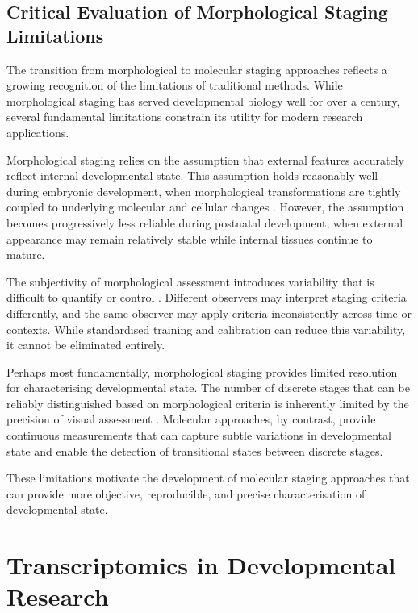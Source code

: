 \subsection{Critical Evaluation of Morphological Staging Limitations}

The transition from morphological to molecular staging approaches reflects a growing recognition of the limitations of traditional methods. While morphological staging has served developmental biology well for over a century, several fundamental limitations constrain its utility for modern research applications.

Morphological staging relies on the assumption that external features accurately reflect internal developmental state. This assumption holds reasonably well during embryonic development, when morphological transformations are tightly coupled to underlying molecular and cellular changes \parencite{orahilly_developmental_2010}. However, the assumption becomes progressively less reliable during postnatal development, when external appearance may remain relatively stable while internal tissues continue to mature.

The subjectivity of morphological assessment introduces variability that is difficult to quantify or control \parencite{boeyer_evidence_2020}. Different observers may interpret staging criteria differently, and the same observer may apply criteria inconsistently across time or contexts. While standardised training and calibration can reduce this variability, it cannot be eliminated entirely.

Perhaps most fundamentally, morphological staging provides limited resolution for characterising developmental state. The number of discrete stages that can be reliably distinguished based on morphological criteria is inherently limited by the precision of visual assessment \parencite{boeyer_evidence_2020}. Molecular approaches, by contrast, provide continuous measurements that can capture subtle variations in developmental state and enable the detection of transitional states between discrete stages.

These limitations motivate the development of molecular staging approaches that can provide more objective, reproducible, and precise characterisation of developmental state.


\section{Transcriptomics in Developmental Research}\label{sec:lit:transcriptomics}

